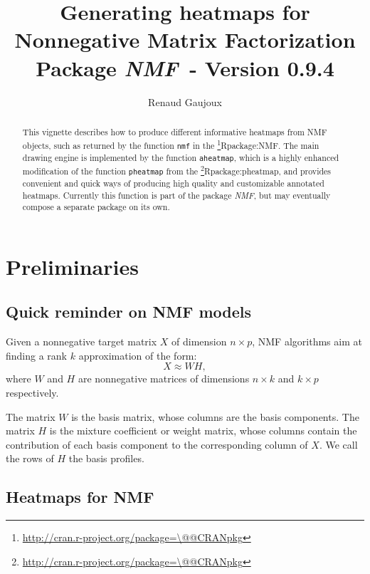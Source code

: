 \documentclass[a4paper]{article}\usepackage{graphicx, color}
\makeatletter
\let\code=\texttt
\newcommand{\pkgname}[1]{\textit{#1}\xspace}
\newcommand{\CRANurl}[1]{\url{http://cran.r-project.org/package=#1}}
\def\CRANpkg{\@ifstar\@CRANpkg\@@CRANpkg}
\def\@CRANpkg#1{\href{http://cran.r-project.org/package=#1}{\pkgname{#1}}\footnote{\CRANurl{#1}}}
\def\@@CRANpkg#1{\href{http://cran.r-project.org/package=#1}{\pkgname{#1}} package\footnote{\CRANurl{#1}}}
\def\citeCRANpkg{\@ifstar\@citeCRANpkg\@@citeCRANpkg}
\def\@citeCRANpkg#1{\CRANpkg{#1}\cite*{Rpackage:#1}}
\def\@@citeCRANpkg#1{\CRANpkg{#1}~\cite{Rpackage:#1}}
\newcommand{\nmfpack}{\pkgname{NMF}}
\renewcommand{\cite}[1]{\parencite{#1}}
\makeatother
\begin{document}
\title{Generating heatmaps for Nonnegative Matrix Factorization\\
\small Package \nmfpack\ - Version 0.9.4}
\author{Renaud Gaujoux}

\maketitle

\begin{abstract}
This vignette describes how to produce different informative heatmaps from NMF objects, 
such as returned by the function \code{nmf} in the \citeCRANpkg{NMF}.
The main drawing engine is implemented by the function \code{aheatmap}, which is 
a highly enhanced modification of the function \code{pheatmap} from the \citeCRANpkg{pheatmap},
and provides convenient and quick ways of producing high quality and customizable annotated heatmaps.
Currently this function is part of the package \nmfpack, but may eventually 
compose a separate package on its own.
\end{abstract}

{\small \tableofcontents}

\section{Preliminaries}

\subsection{Quick reminder on NMF models}

Given a nonnegative target matrix $X$ of dimension $n\times p$, NMF algorithms 
aim at finding a rank $k$ approximation of the form:
$$
X \approx W H,
$$
where $W$ and $H$ are nonnegative matrices of dimensions $n\times k$ and $k\times p$ 
respectively.

The matrix $W$ is the basis matrix, whose columns are the basis components.
The matrix $H$ is the mixture coefficient or weight matrix, whose columns contain 
the contribution of each basis component to the corresponding column of $X$.
We call the rows of $H$ the basis profiles.

\subsection{Heatmaps for NMF}
\end{document}
